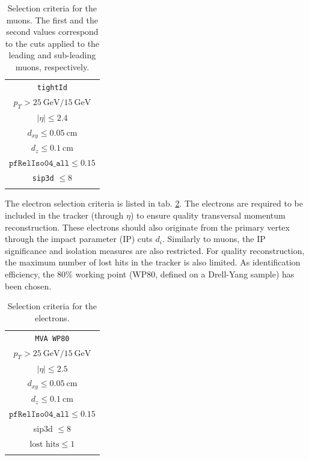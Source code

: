 \begin{table}[h!]
	\centering
	\begin{tabular}{c}
		\hline
		\texttt{tightId} \\
		$p_T > \SI{25}{\giga\electronvolt}/\SI{15}{\giga\electronvolt}$ \\
		$|\eta| \leq 2.4$ \\
		$d_{xy} \leq \SI{0.05}{\centi\meter}$ \\
		$d_z \leq \SI{0.1}{\centi\meter}$ \\
		$\texttt{pfRelIso04\_all} \leq 0.15$  \\
		\texttt{sip3d} $\leq 8$ \\
		\hline \\
	\end{tabular}
	\caption{Selection criteria for the muons. The first and the second values correspond to the cuts applied to the leading and sub-leading muons, respectively.}
	\label{tab:muon_selection}
\end{table}

The electron selection criteria is listed in tab. \ref{tab:electron_selection}. The electrons are required to be included in the tracker (through $\eta$) to ensure quality transversal momentum reconstruction. These electrons should also originate from the primary vertex through the impact parameter (IP) cuts $d_i$. Similarly to muons, the IP significance and isolation measures are also restricted. For quality reconstruction, the maximum number of lost hits in the tracker is also limited. As identification efficiency, the 80\% working point (WP80, defined on a Drell-Yang sample) has been chosen.

\begin{table}[h!]
	\centering
	\begin{tabular}{c}
		\hline
		\texttt{MVA WP80} \\
		$p_T > \SI{25}{\giga\electronvolt}/\SI{15}{\giga\electronvolt} $\\
		$|\eta| \leq 2.5$ \\
		$d_{xy} \leq \SI{0.05}{\centi\meter}$ \\
		$d_z \leq \SI{0.1}{\centi\meter}$ \\
		$\texttt{pfRelIso04\_all} \leq 0.15$  \\
		sip3d $\leq 8$ \\
		$\text{lost hits} \leq 1$ \\
		\hline \\
	\end{tabular}
	\caption{Selection criteria for the electrons.}
	\label{tab:electron_selection}
\end{table}

